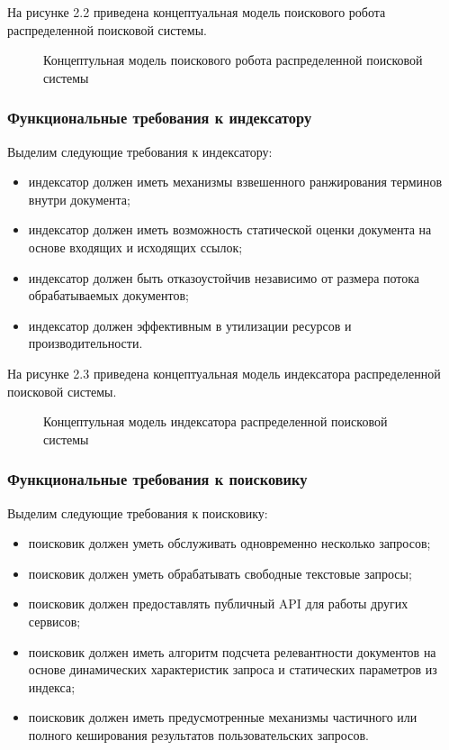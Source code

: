 На рисунке 2.2 приведена концептуальная модель поискового робота распределенной поисковой системы.

\begin{figure}[H]
\caption{Концептульная модель поискового робота распределенной поисковой системы}
\label{concept_robot_model:image}
\end{figure}

\subsubsection{Функциональные требования к индексатору}
Выделим следующие требования к индексатору:
\begin{itemize}
\item индексатор должен иметь механизмы взвешенного ранжирования терминов внутри документа;
\item индексатор должен иметь возможность статической оценки документа на основе входящих и исходящих ссылок;
\item индексатор должен быть отказоустойчив независимо от размера потока обрабатываемых документов;
\item индексатор должен эффективным в утилизации ресурсов и производительности.
\end{itemize}

На рисунке 2.3 приведена концептуальная модель индексатора распределенной поисковой системы.

\begin{figure}[H]
\caption{Концептульная модель индексатора распределенной поисковой системы}
\label{concept_indexer_model:image}
\end{figure}

\subsubsection{Функциональные требования к поисковику}
Выделим следующие требования к поисковику:
\begin{itemize}
\item поисковик должен уметь обслуживать одновременно несколько запросов;
\item поисковик должен уметь обрабатывать свободные текстовые запросы;
\item поисковик должен предоставлять публичный API для работы других сервисов;
\item поисковик должен иметь алгоритм подсчета релевантности документов на основе динамических характеристик запроса и статических параметров из индекса;
\item поисковик должен иметь предусмотренные механизмы частичного или полного кеширования результатов пользовательских запросов.
\end{itemize}


